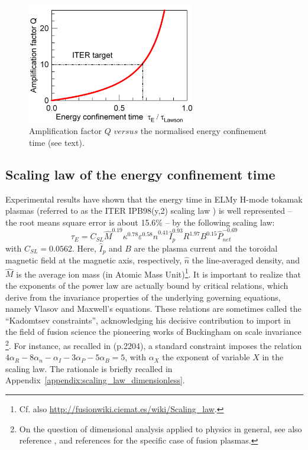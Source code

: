 \begin{figure} 
	\begin{center}
		\includegraphics[width=0.65\textwidth]{figures/Graph_Qfactor_tauE.png}
		\caption{Amplification factor $Q$ $versus$ the normalised energy confinement time (see text).}
		\label{fig:Q_tauE}
	\end{center}
\end{figure}


\subsection{Scaling law of the energy confinement time}
\label{sec:scaling_law}

Experimental results have shown that the energy time in ELMy H-mode tokamak plasmas (referred to as the ITER IPB98(y,2) scaling law \cite[eq.(20)]{ITERphysics_chap2}) is well represented -- the root means square error is about 15.6\% -- by the following scaling law:
\begin{equation*}
  \label{eq:scaling_law_IPB98(y,2)}
  \tau_E = C_{SL} \hat M^{0.19} \kappa^{0.78} \varepsilon^{0.58} 
  \hat n^{0.41} \hat I_p^{0.93} R^{1.97} B^{0.15}  \hat P_{net}^{-0.69}
\end{equation*}
with $C_{SL} = 0.0562$.
Here, $\hat I_p$ and $B$ are the plasma current and the toroidal magnetic field at the magnetic axis, respectively, $\hat n$ the line-averaged density, and $\hat M$ is the average ion mass (in Atomic Mass Unit)\footnote{Cf. also \url{http://fusionwiki.ciemat.es/wiki/Scaling_law}.}. 
It is important to realize that the exponents of the power law are actually bound by critical relations, which derive from the invariance properties of the underlying governing equations, namely Vlasov and Maxwell's equations. These relations are sometimes called the ``Kadomtsev constraints'', acknowledging his decisive contribution \cite{Kadomtsev1975} to import in the field of fusion science the pioneering works of Buckingham on scale invariance \cite{Buckingham1914}\footnote{On the question of dimensional analysis applied to physics in general, see also reference \cite{Misic2010}, and references \cite{Connor1977, Luce2008} for the specific case of fusion plasmas.}. For instance, as recalled in \cite{ITERphysics_chap2} (p.2204), a standard constraint imposes the relation 
$4\alpha_R - 8\alpha_n - \alpha_I - 3\alpha_P - 5\alpha_B = 5$, with $\alpha_X$ the exponent of variable $X$ in the scaling law. The rationale is briefly recalled in Appendix~\ref{appendix:scaling_law_dimensionless}.

